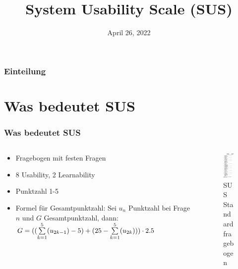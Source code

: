 \documentclass[12pt, aspectratio=169]{beamer}
\title{System Usability Scale (SUS)}
\author[Y. Höll, F. Jäpel]{}
\date{April 26, 2022}
\begin{document}
\begin{frame}
	\titlepage
\end{frame}

\begin{frame}
	\frametitle{Einteilung}
	\tableofcontents
\end{frame}

\section{Was bedeutet SUS}
\begin{frame}
	\frametitle{Was bedeutet SUS}
	\begin{columns}
		\begin{column}{0.7\textwidth}
			\begin{itemize}
				\item<1> Fragebogen mit festen Fragen
				\item<1> 8 Usability, 2 Learnability
				\item<1> Punktzahl 1-5
				\item<1> Formel für Gesamtpunktzahl: 
				Sei $u_n$ Punktzahl bei Frage $n$ und $G$ Gesamtpunktzahl, dann:
				\begin{math} G=((\sum\limits_{k=1}^5(u_{2k-1})-5) + (25-\sum\limits_{k=1}^5(u_{2k}))) \cdot 2.5 $\\$ \end{math}
			\end{itemize}
		\end{column}
		\begin{column}{0.3\textwidth}
			\begin{figure}
				\centering
				\includegraphics[keepaspectratio=true, width=65px]{./image/sus.png}
				\caption{SUS Standardfragebogen \tiny{\cite{wiki1}}}
			\end{figure}		
		\end{column}
	\end{columns}
\end{frame}
\end{document}

